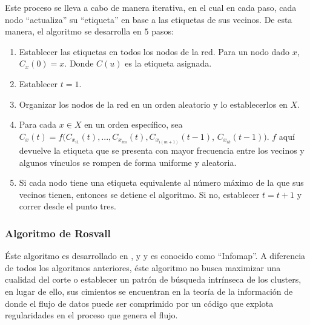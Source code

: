 \documentclass[12pt,letter]{article}
\begin{document}
\vspace{0.5cm}

Este proceso se lleva a cabo de manera iterativa, en el cual en cada paso, cada nodo ``actualiza'' su ``etiqueta'' en base a las etiquetas de sus vecinos. De esta manera, el algoritmo se desarrolla en $5$ pasos:

\begin{enumerate}
\item Establecer las etiquetas en todos los nodos de la red. Para un nodo dado $x$, $C_{x}(0) = x$. Donde $C(u)$ es la etiqueta asignada.
\item Establecer $t = 1$.
\item Organizar los nodos de la red en un orden aleatorio y lo establecerlos en $X$.
\item Para cada $x \in X$ en un orden específico, sea $C_{x}(t) = f (C_{x_{i1}}(t),...,C_{x_{im}}(t),C_{x_{i(m+1)}}(t-1)$, $C_{x_{ik}} (t-1))$. $f$ aquí devuelve la etiqueta que se presenta con mayor frecuencia entre los vecinos y algunos vínculos se rompen de forma uniforme y aleatoria.
\item Si cada nodo tiene una etiqueta equivalente al número máximo de la que sus vecinos tienen, entonces se detiene el algoritmo. Si no, establecer $t = t + 1$ y correr desde el punto tres.
\end{enumerate}

\subsubsection{Algoritmo de Rosvall \citep{Rosvall1, Rosvall2, Rosvall3}} 
Éste algoritmo es desarrollado en \cite{Rosvall1}, \cite{Rosvall2} y \cite{Rosvall2} y es conocido como ``Infomap''. A diferencia de todos los algoritmos anteriores, éste algoritmo no busca maximizar una cualidad del corte o establecer un patrón de búsqueda intrínseca de los clusters, en lugar de ello, sus cimientos se encuentran en la teoría de la información de \cite{Shannon} donde el flujo de datos puede ser comprimido por un código que explota regularidades en el proceso que genera el flujo.
\end{document}
